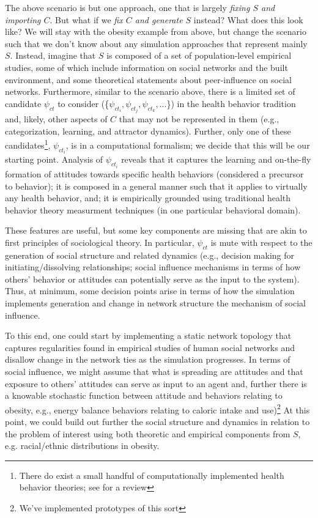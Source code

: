 \documentclass{article}
\begin{document}
The above scenario is but one approach, one that is largely \textit{fixing $S$ and importing $C$}.  But what if we \textit{fix $C$ and generate $S$} instead?  What does this look like?  We will stay with the obesity example from above, but change the scenario such that we don't know about any simulation approaches that represent mainly $S$.  Instead, imagine that $S$ is composed of a set of population-level empirical studies, some of which include information on social networks and the built environment, and some theoretical statements about peer-influence on social networks. Furthermore, similar to the scenario above, there is a limited set of candidate $\psi_{ct}$ to consider (\{$\psi_{ct_i}, \psi_{ct_j}, \psi_{ct_k},...$\}) in the health behavior tradition and, likely, other aspects of $C$ that may not be represented in them (e.g., categorization, learning, and attractor dynamics).  Further, only one of these candidates\footnote{There do exist a small handful of computationally implemented health behavior theories; see \cite{orr2017readbook} for a review}, $\psi_{ct_i}$, is in a computational formalism; we decide that this will be our starting point.  Analysis of $\psi_{ct_i}$ reveals that it captures the learning and on-the-fly formation of attitudes towards specific health behaviors (considered a precursor to behavior); it is composed in a general manner such that it applies to virtually any health behavior, and; it is empirically grounded using traditional health behavior theory measurment techniques (in one particular behavioral domain). 

These features are useful, but some key components are missing that are akin to first principles of sociological theory.  In particular, $\psi_{ct}$ is mute with respect to the generation of social structure and related dynamics (e.g., decision making for initiating/dissolving relationships; social influence mechanisms in terms of how others' behavior or attitudes can potentially serve as the input to the system).  Thus, at minimum, some decision points arise in terms of how the simulation implements generation and change in network structure the mechanism of social influence.  

To this end, one could start by implementing a static network topology that captures regularities found in empirical studies of human social networks and disallow change in the network ties as the simulation progresses.  In terms of social influence, we might assume that what is spreading are attitudes and that exposure to others' attitudes can serve as input to an agent and, further there is a knowable stochastic function between attitude and behaviors relating to obesity, e.g., energy balance behaviors relating to caloric intake and use)\footnote{We've implemented prototypes of this sort\cite{orr2017galeabook}} At this point, we could build out further the social structure and dynamics in relation to the problem of interest using both theoretic and empirical components from $S$, e.g. racial/ethnic distributions in obesity.  
\end{document}

